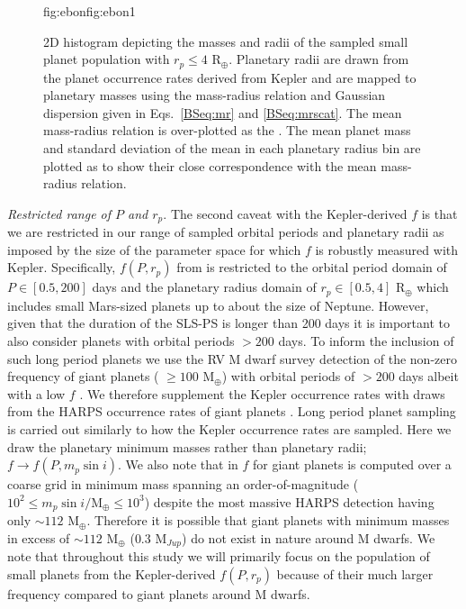 \begin{figure}
\begin{ocg}{fig:ebon}{fig:ebon}{1}
  \end{ocg}
  \hspace{-0.6\hsize}%
  \caption[Masses and radii of synthetic planets in the simulated SLS-PS.]
    {\small 2D histogram depicting the masses and radii of the sampled
    small planet population with $r_p \leq 4$ R$_{\oplus}$. Planetary radii are drawn from the
    planet occurrence rates derived from Kepler and are mapped to 
    planetary masses using the mass-radius relation and Gaussian
    dispersion given in Eqs.~\ref{BSeq:mr} and \ref{BSeq:mrscat}. The mean
    mass-radius relation is over-plotted as the 
    . The mean
    planet mass and standard deviation of the mean in each planetary radius bin are plotted as
     to
    show their close correspondence with the mean mass-radius relation.}
  \label{BSfig:mr}
\end{figure}

\emph{Restricted range of $P$ and $r_p$}. The second caveat with the Kepler-derived $f$ is that
we are restricted in
our range of sampled orbital periods and planetary radii as imposed by the size of the parameter space
for which $f$ is robustly measured with Kepler. Specifically, $f(P,r_p)$ from \cite{dressing15a}
is restricted to the orbital period domain of $P \in [0.5,200]$ days and the planetary radius domain of 
$r_p \in [0.5,4]$ R$_{\oplus}$ which includes small Mars-sized planets up to about the size of Neptune. 
However, given that the duration of the SLS-PS is longer than 200 days it is important to also consider planets
with orbital periods $> 200$ days. To inform the inclusion of such long period planets we use the RV M dwarf
survey detection of the non-zero frequency of giant planets 
(\msini{} $\ge 100$ M$_{\oplus}$) with orbital 
periods of $>200$ days albeit with a low $f$ \citep[$\lesssim 5$\%;][]{bonfils13}.
We therefore supplement the Kepler occurrence rates with draws 
from the HARPS occurrence rates of giant planets \citep{bonfils13}.
Long period planet sampling is carried out similarly to how the Kepler occurrence rates are sampled.
Here we draw the planetary minimum masses rather than planetary radii; $f \to f(P,m_p\sin{i})$.
We also note that in \cite{bonfils13} $f$ for giant planets is computed over a coarse grid
in minimum mass spanning an order-of-magnitude 
($10^2 \le m_p\sin{i}/\text{M}_{\oplus} \le 10^3$) despite the most massive HARPS detection having only
\msini{} $\sim 112$ M$_{\oplus}$. Therefore it is possible that giant planets with minimum masses in excess
of $\sim 112$ M$_{\oplus}$ ($0.3$ M$_{Jup}$) do not exist in nature around M dwarfs.
We note that throughout this study we will
primarily focus on the population of small planets from the Kepler-derived $f(P,r_p)$ 
because of their much larger frequency compared to giant planets around M dwarfs. \\

